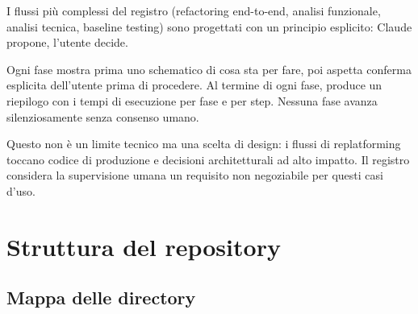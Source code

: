 \documentclass[12pt,a4paper,twoside]{book}
\begin{document}
I flussi più complessi del registro (refactoring end-to-end, analisi funzionale, analisi tecnica, baseline testing) sono progettati con un principio esplicito: Claude propone, l'utente decide.

Ogni fase mostra prima uno schematico di cosa sta per fare, poi aspetta conferma esplicita dell'utente prima di procedere. Al termine di ogni fase, produce un riepilogo con i tempi di esecuzione per fase e per step. Nessuna fase avanza silenziosamente senza consenso umano.

Questo non è un limite tecnico ma una scelta di design: i flussi di replatforming toccano codice di produzione e decisioni architetturali ad alto impatto. Il registro considera la supervisione umana un requisito non negoziabile per questi casi d'uso.

\chapter{Struttura del repository}

\section{Mappa delle directory}
\end{document}
